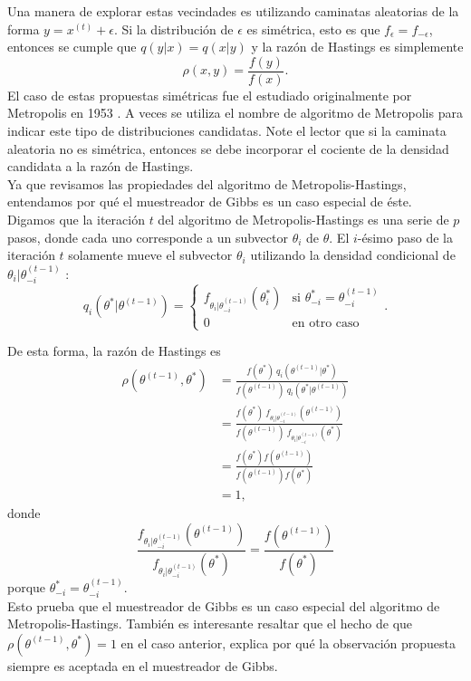 \documentclass[11pt,a4paper]{article}
\begin{document}
Una manera de explorar estas vecindades es utilizando caminatas aleatorias de la forma $y = x^{(t)} + \epsilon$. Si la distribución de $\epsilon$ es simétrica, esto es que $f_{\epsilon} = f_{-\epsilon}$, entonces se cumple que $q(y|x) = q(x|y)$ y la razón de Hastings es simplemente $$\rho (x, y) = \frac{f(y)}{f(x)}.$$ El caso de estas propuestas simétricas fue el estudiado originalmente por Metropolis en 1953 \citep{gelman}. A veces se utiliza el nombre de algoritmo de Metropolis para indicar este tipo de distribuciones candidatas. Note el lector que si la caminata aleatoria no es simétrica, entonces se debe incorporar el cociente de la densidad candidata a la razón de Hastings.\\

Ya que revisamos las propiedades del algoritmo de Metropolis-Hastings, entendamos por qué el muestreador de Gibbs es un caso especial de éste. Digamos que la iteración $t$ del algoritmo de Metropolis-Hastings es una serie de $p$ pasos, donde cada uno corresponde a un subvector $\theta_i$ de $\theta$. El $i$-ésimo paso de la iteración $t$ solamente mueve el subvector $\theta_i$ utilizando la densidad condicional de $\theta_i | \theta^{(t-1)}_{-i}$ \citep{gelman}:
$$q_i(\theta^* | \theta^{(t-1)}) = \begin{cases}
f_{\theta_i | \theta_{-i}^{(t-1)}} (\theta^*_{i}) & \text{si } \theta^*_{-i} = \theta^{(t-1)}_{-i}\\
0 & \text{en otro caso} \end{cases}.$$

De esta forma, la razón de Hastings es
\begin{align*}
\rho(\theta^{(t-1)}, \theta^*) &= \frac{f(\theta^*) \ q_i(\theta^{(t-1)}|\theta^*)}{f(\theta^{(t-1)}) \ q_i(\theta^*|\theta^{(t-1)})}\\
&= \frac{f(\theta^*) \ f_{\theta_i|\theta_{-i}^{(t-1)}}(\theta^{(t-1)})}{f(\theta^{(t-1)}) \ f_{\theta_i|\theta_{-i}^{(t-1)}}(\theta^*)}\\
&= \frac{f(\theta^*)f(\theta^{(t-1)})}{f(\theta^{(t-1)})f(\theta^*)}\\
&= 1,
\end{align*}
donde $$\frac{f_{\theta_i|\theta_{-i}^{(t-1)}}(\theta^{(t-1)})}{f_{\theta_i|\theta_{-i}^{(t-1)}}(\theta^*)} = \frac{f(\theta^{(t-1)})}{f(\theta^*)}$$ porque $\theta_{-i}^* = \theta_{-i}^{(t-1)}$.\\

Esto prueba que el muestreador de Gibbs es un caso especial del algoritmo de Metropolis-Hastings. También es interesante resaltar que el hecho de que  $\rho(\theta^{(t-1)}, \theta^*) = 1$ en el caso anterior, explica por qué la observación propuesta siempre es aceptada en el muestreador de Gibbs.\\
\end{document}
